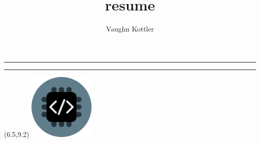 \documentclass[letterpaper,10pt]{article}
\title{resume}
\author{Vaughn Kottler}
\newcommand{\HR}{{\centering\noindent\rule{7.75in}{0.5pt}}\break}
\begin{document}
%
\noindent
\noindent
\noindent
\HR

\noindent
\noindent
\noindent
\HR
%
\begin{textblock}{1.25} (6.5,9.2)
\includegraphics[width=1.25in,height=1.25in]{im/logo_circle_512.png}
\end{textblock}
\noindent

\end{document}
